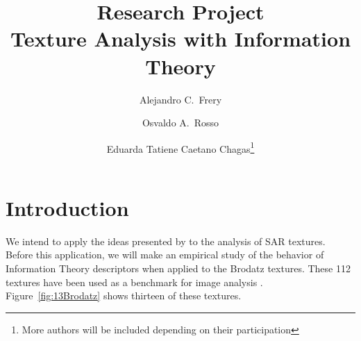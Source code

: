 \documentclass[12pt]{article}
\title{Research Project\\
Texture Analysis with Information Theory}
\author{Alejandro C.\ Frery
\and Osvaldo A.\ Rosso
\and Eduarda Tatiene Caetano Chagas\footnote{More authors will be included depending on their participation}}
\date{}
\begin{document}
\maketitle

\section{Introduction}

We intend to apply the ideas presented by \citet{HistoryofArtPaintingsthroughtheLensofEntropyandComplexity2018} to the analysis of SAR textures.
Before this application, we will make an empirical study of the behavior of Information Theory descriptors when applied to the Brodatz textures.
These \num{112} textures \citep[][available at \url{http://sipi.usc.edu/database/database.php?volume=textures}]{TexturesaPhotographicAlbumforArtistsandDesigners1966} have been used as a benchmark for image analysis \citep{TextureFeaturesBasedonTextureSpectrum1991}.
Figure~\ref{fig:13Brodatz} shows thirteen of these textures.
\end{document}
